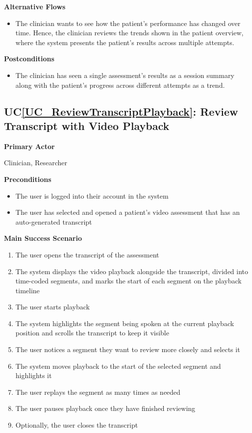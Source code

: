 \documentclass[12pt]{article}
\newcounter{ucnum} %
\newcommand{\ucref}[1]{UC\ref{#1}}
\begin{document}
\textbf{Alternative Flows}
\begin{itemize}
\item[3a.] The clinician wants to see how the patient’s performance has changed over time. Hence, the clinician reviews the trends shown in the patient overview, where the system presents the patient’s results across multiple attempts.
\end{itemize}

\textbf{Postconditions}
\begin{itemize}
\item The clinician has seen a single assessment’s results as a session summary along with the patient’s progress across different attempts as a trend.
\end{itemize}

 \label{UC_ReviewTranscriptPlayback}
\subsection{\ucref{UC_ReviewTranscriptPlayback}: Review Transcript with Video Playback}

\textbf{Primary Actor}

Clinician, Researcher

\textbf{Preconditions}
\begin{itemize}
\item The user is logged into their account in the system
\item The user has selected and opened a patient’s video assessment that has an auto-generated transcript
\end{itemize}

\textbf{Main Success Scenario}
\begin{enumerate}
\item The user opens the transcript of the assessment
\item The system displays the video playback alongside the transcript, divided into time-coded segments, and marks the start of each segment on the playback timeline
\item The user starts playback
\item The system highlights the segment being spoken at the current playback position and scrolls the transcript to keep it visible
\item The user notices a segment they want to review more closely and selects it
\item The system moves playback to the start of the selected segment and highlights it
\item The user replays the segment as many times as needed
\item The user pauses playback once they have finished reviewing
\item Optionally, the user closes the transcript
\end{enumerate}
\end{document}
